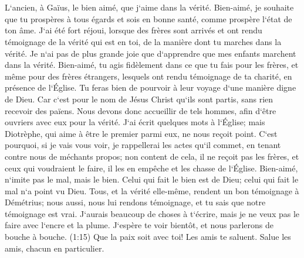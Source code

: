 

\chapter{}

\verse L`ancien, à Gaïus, le bien aimé, que j`aime dans la vérité. 
\verse Bien-aimé, je souhaite que tu prospères à tous égards et sois en bonne santé, comme prospère l`état de ton âme. 
\verse J`ai été fort réjoui, lorsque des frères sont arrivés et ont rendu témoignage de la vérité qui est en toi, de la manière dont tu marches dans la vérité. 
\verse Je n`ai pas de plus grande joie que d`apprendre que mes enfants marchent dans la vérité. 
\verse Bien-aimé, tu agis fidèlement dans ce que tu fais pour les frères, et même pour des frères étrangers, 
\verse lesquels ont rendu témoignage de ta charité, en présence de l`Église. Tu feras bien de pourvoir à leur voyage d`une manière digne de Dieu. 
\verse Car c`est pour le nom de Jésus Christ qu`ils sont partis, sans rien recevoir des païens. 
\verse Nous devons donc accueillir de tels hommes, afin d`être ouvriers avec eux pour la vérité. 
\verse J`ai écrit quelques mots à l`Église; mais Diotrèphe, qui aime à être le premier parmi eux, ne nous reçoit point. 
\verse C`est pourquoi, si je vais vous voir, je rappellerai les actes qu`il commet, en tenant contre nous de méchants propos; non content de cela, il ne reçoit pas les frères, et ceux qui voudraient le faire, il les en empêche et les chasse de l`Église. 
\verse Bien-aimé, n`imite pas le mal, mais le bien. Celui qui fait le bien est de Dieu; celui qui fait le mal n`a point vu Dieu. 
\verse Tous, et la vérité elle-même, rendent un bon témoignage à Démétrius; nous aussi, nous lui rendons témoignage, et tu sais que notre témoignage est vrai. 
\verse J`aurais beaucoup de choses à t`écrire, mais je ne veux pas le faire avec l`encre et la plume. 
\verse J`espère te voir bientôt, et nous parlerons de bouche à bouche. (1:15) Que la paix soit avec toi! Les amis te saluent. Salue les amis, chacun en particulier. 

